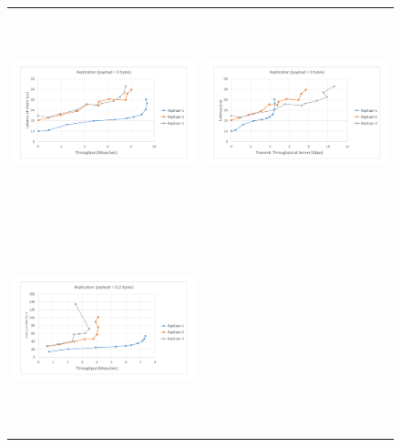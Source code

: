 \documentclass[letterpaper,twocolumn,10pt]{article}
\begin{document}
\begin{figure}
\begin{tabular}{cc}
\begin{minipage}{0.5\textwidth}
  \includegraphics[width=\textwidth,height=6cm]{results/replication_mops_0.pdf}
\end{minipage}&
\begin{minipage}{0.5\textwidth}
  \includegraphics[width=\textwidth,height=6cm]{results/replication_gbps_0.pdf}
\end{minipage}\\
\begin{minipage}{0.5\textwidth}
  \includegraphics[width=\textwidth,height=6cm]{results/replication_mops_512.pdf}
\end{minipage}&
\begin{minipage}{0.5\textwidth}

\end{minipage}
\end{tabular}
\end{figure}
\end{document}
